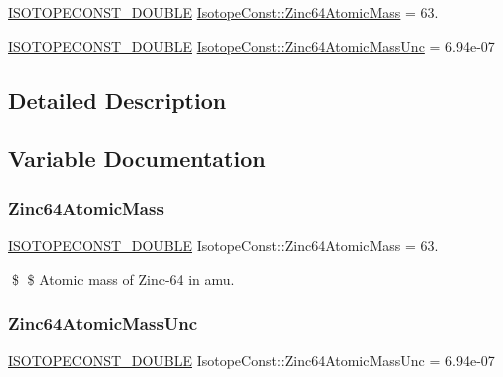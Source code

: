 \begin{DoxyCompactItemize}
\item 
\mbox{\hyperlink{group___isotope_const-_macros_ga8f45a7272ce02c0b4c65c44636ed719a}{I\+S\+O\+T\+O\+P\+E\+C\+O\+N\+S\+T\+\_\+\+D\+O\+U\+B\+LE}} \mbox{\hyperlink{group___isotope_const-_zinc-_zn64_ga6da0d9cb8158a836ccfebd766fd7281a}{Isotope\+Const\+::\+Zinc64\+Atomic\+Mass}} = 63.
\item 
\mbox{\hyperlink{group___isotope_const-_macros_ga8f45a7272ce02c0b4c65c44636ed719a}{I\+S\+O\+T\+O\+P\+E\+C\+O\+N\+S\+T\+\_\+\+D\+O\+U\+B\+LE}} \mbox{\hyperlink{group___isotope_const-_zinc-_zn64_ga3b488ecb8c9839d24503e3d2626598d2}{Isotope\+Const\+::\+Zinc64\+Atomic\+Mass\+Unc}} = 6.\+94e-\/07
\end{DoxyCompactItemize}


\subsection{Detailed Description}


\subsection{Variable Documentation}
\mbox{\label{group___isotope_const-_zinc-_zn64_ga6da0d9cb8158a836ccfebd766fd7281a}} 
\subsubsection{\texorpdfstring{Zinc64\+Atomic\+Mass}{Zinc64AtomicMass}}
{\footnotesize\ttfamily \mbox{\hyperlink{group___isotope_const-_macros_ga8f45a7272ce02c0b4c65c44636ed719a}{I\+S\+O\+T\+O\+P\+E\+C\+O\+N\+S\+T\+\_\+\+D\+O\+U\+B\+LE}} Isotope\+Const\+::\+Zinc64\+Atomic\+Mass = 63.}

\$ \$ Atomic mass of Zinc-\/64 in amu. \mbox{\label{group___isotope_const-_zinc-_zn64_ga3b488ecb8c9839d24503e3d2626598d2}} 
\subsubsection{\texorpdfstring{Zinc64\+Atomic\+Mass\+Unc}{Zinc64AtomicMassUnc}}
{\footnotesize\ttfamily \mbox{\hyperlink{group___isotope_const-_macros_ga8f45a7272ce02c0b4c65c44636ed719a}{I\+S\+O\+T\+O\+P\+E\+C\+O\+N\+S\+T\+\_\+\+D\+O\+U\+B\+LE}} Isotope\+Const\+::\+Zinc64\+Atomic\+Mass\+Unc = 6.\+94e-\/07}

